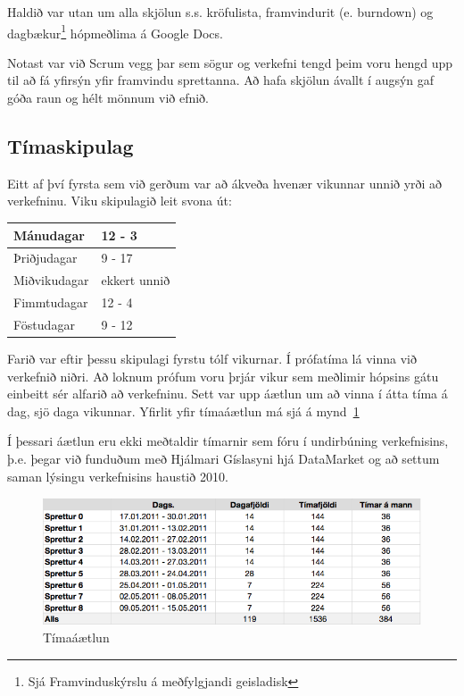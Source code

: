 \documentclass{article}
\begin{document}
Haldið var utan um alla skjölun s.s. kröfulista, framvindurit (e. burndown) og dagbækur\footnote{Sjá Framvinduskýrslu á meðfylgjandi geisladisk}
 hópmeðlima á Google Docs. 

Notast var við Scrum vegg þar sem sögur og verkefni tengd þeim voru hengd upp til að fá yfirsýn 
yfir framvindu sprettanna. Að hafa skjölun ávallt í augsýn gaf góða raun og hélt mönnum við efnið.

\subsection{Tímaskipulag}
Eitt af því fyrsta sem við gerðum var að ákveða hvenær 
vikunnar unnið yrði að verkefninu.
Viku skipulagið leit svona út:

\vspace{5 mm}
\begin{tabular}{| l | l |}
\hline
  Mánudagar & 12 - 3 \\
  \hline
  Þriðjudagar & 9 - 17 \\
  \hline
  Miðvikudagar & ekkert unnið\\
  \hline
  Fimmtudagar & 12 - 4 \\
  \hline
  Föstudagar & 9 - 12\\
\hline
\end{tabular}
\vspace{5 mm}

Farið var eftir þessu skipulagi fyrstu tólf vikurnar. 
Í prófatíma lá vinna við verkefnið niðri. 
Að loknum prófum voru þrjár vikur sem meðlimir hópsins gátu einbeitt sér alfarið
að verkefninu. Sett var upp áætlun um að vinna í átta tíma á dag, sjö daga
vikunnar. Yfirlit yfir tímaáætlun má sjá á mynd~\ref{fig:timeplan}

Í þessari áætlun eru ekki meðtaldir tímarnir sem fóru í undirbúning verkefnisins, þ.e.
þegar við funduðum með Hjálmari Gíslasyni hjá DataMarket og að settum saman
lýsingu verkefnisins haustið 2010.

\begin{figure}[H]
  \centering
  \includegraphics[width=1\textwidth]{sprettir_timar.png} 
  \caption{Tímaáætlun} 
  \label{fig:timeplan}
\end{figure}
\end{document}
